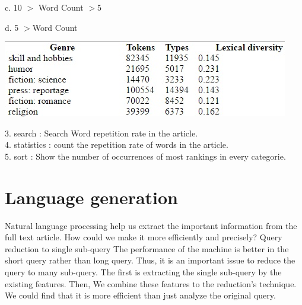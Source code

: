 c. 10 $>$ Word Count $>$5 

d. 5 $>$Word Count

\begin{center}
	\includegraphics[width=\columnwidth]{union_02.jpg}
\end{center}
3. search       : Search Word repetition rate in the article.\\
4. statistics     : count the repetition rate of words in the article.\\
5. sort         : Show the  number of occurrences of most rankings in every categorie.\\




\section*{Language generation}
\label{sec:prob}
Natural language processing help us extract the important information from the full text article.
How could we make it more efficiently and precisely?
Query reduction to single sub-query
The performance of the machine is better in the short query rather than long query. Thus, it is an important issue to reduce the query to many sub-query.  The first is extracting the single sub-query by the existing features. Then, We combine these features to the reduction's technique. We could find that it is more efficient than just analyze the original query. 

